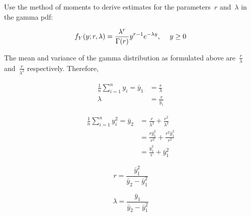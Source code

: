 \begin{problem}
   Use the method of moments to derive estimates for the parameters~$r$ and~$\lambda$ in the gamma pdf:

  \begin{equation}
    f_{Y}(y;r,\lambda) = \frac{\lambda^{r}}{\Gamma(r)} y^{r-1} e^{-\lambda y}\text{,} \hspace{0.5cm}y \geq 0
  \end{equation}
\end{problem}


The mean and variance of the gamma distribution as formulated above are~$\frac{r}{\lambda}$ and~$\frac{r}{\lambda^2}$ respectively.  Therefore,

\begin{align*}
  \frac{1}{n} \sum_{i=1}^{n} y_i = \bar{y}_1 &= \frac{r}{\lambda} \\
                         \lambda &= \frac{r}{\bar{y}_{1}}
\end{align*}

\begin{align*}
  \frac{1}{n} \sum_{i=1}^{n} y_{i}^{2} = \bar{y}_2  &= \frac{r}{\lambda^{2}} + \frac{r^2}{\lambda^2} \\
                                        &= \frac{r\bar{y}_{1}^2}{r^2} + \frac{r^2\bar{y}_{1}^2}{r^2} \\
                                        &= \frac{\bar{y}_{1}^2}{r} + \bar{y}_{1}^2
\end{align*}

\begin{equation}
  r = \boxed{\frac{\bar{y}_{1}^{2}}{\bar{y}_{2} - \bar{y}_{1}^{2}}}
\end{equation}

\begin{equation*}
  \lambda = \boxed{\frac{\bar{y}_{1}}{\bar{y}_{2} - \bar{y}_{1}^{2}}}
\end{equation*}
